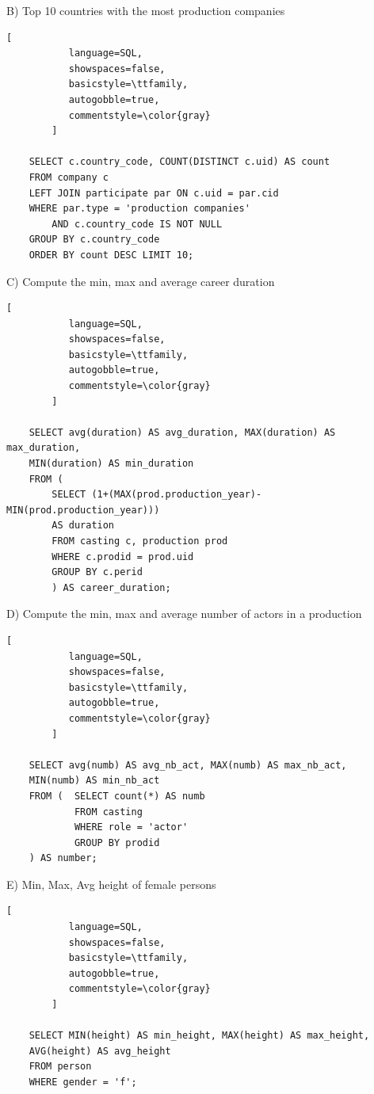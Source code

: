 \documentclass{article}
\begin{document}
B) Top 10 countries with the most production companies
    \begin{lstlisting}[
           language=SQL,
           showspaces=false,
           basicstyle=\ttfamily,
           autogobble=true,
           commentstyle=\color{gray}
        ]

    SELECT c.country_code, COUNT(DISTINCT c.uid) AS count 
    FROM company c
    LEFT JOIN participate par ON c.uid = par.cid
    WHERE par.type = 'production companies'
        AND c.country_code IS NOT NULL
    GROUP BY c.country_code
    ORDER BY count DESC LIMIT 10;
    \end{lstlisting}
    
\medskip

C) Compute the min, max and average career duration
    \begin{lstlisting}[
           language=SQL,
           showspaces=false,
           basicstyle=\ttfamily,
           autogobble=true,
           commentstyle=\color{gray}
        ]
        
    SELECT avg(duration) AS avg_duration, MAX(duration) AS max_duration, 
    MIN(duration) AS min_duration
    FROM (  
        SELECT (1+(MAX(prod.production_year)-MIN(prod.production_year))) 
        AS duration
        FROM casting c, production prod
        WHERE c.prodid = prod.uid
        GROUP BY c.perid
        ) AS career_duration;
    \end{lstlisting}
\medskip

D) Compute the min, max and average number of actors in a production
    \begin{lstlisting}[
           language=SQL,
           showspaces=false,
           basicstyle=\ttfamily,
           autogobble=true,
           commentstyle=\color{gray}
        ]
        
    SELECT avg(numb) AS avg_nb_act, MAX(numb) AS max_nb_act, 
    MIN(numb) AS min_nb_act
    FROM (  SELECT count(*) AS numb
            FROM casting
            WHERE role = 'actor'
            GROUP BY prodid
    ) AS number;
    \end{lstlisting}
\medskip

E) Min, Max, Avg height of female persons
    \begin{lstlisting}[
           language=SQL,
           showspaces=false,
           basicstyle=\ttfamily,
           autogobble=true,
           commentstyle=\color{gray}
        ]
        
    SELECT MIN(height) AS min_height, MAX(height) AS max_height, 
    AVG(height) AS avg_height 
    FROM person
    WHERE gender = 'f';
    \end{lstlisting}
\medskip
\end{document}
